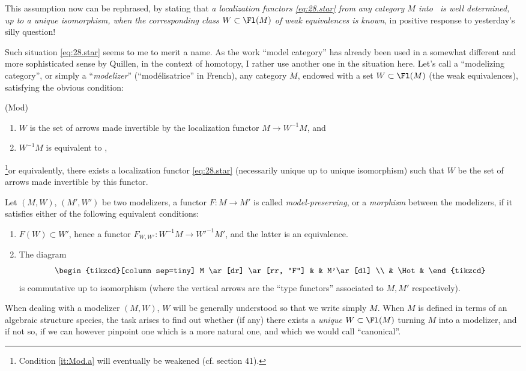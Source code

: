 This assumption now can be rephrased, by stating that \emph{a localization
functors \eqref{eq:28.star} from any category $M$ into \Hot\ is well
determined, up to a unique isomorphism, when the corresponding class
$W \subset \Fl(M)$ of weak equivalences is known}, in positive response
to yesterday's silly question!

Such situation \eqref{eq:28.star} seems to me to merit a name. As the
work ``model category'' has already been used in a somewhat different
and more sophisticated sense by Quillen, in the context of homotopy, I
rather use another one in the situation here. Let's call
a ``modelizing category'', or simply a ``\emph{modelizer}''
(``mod\'elisatrice'' in French), any category $M$, endowed with a set
$W \subset \Fl(M)$ (the weak equivalences), satisfying the obvious
condition:

\noindent\parbox[t]{0.1\textwidth}{(Mod)\par}
\parbox[t]{0.9\textwidth}{\vspace*{-11pt}%
  \begin{enumerate}[,label=\alph*)]
  \item\label{it:Mod.a}
    $W$ is the set of arrows made invertible by the localization
    functor $M \to W^{-1}M$, and
  \item\label{it:Mod.b}
    $W^{-1}M$ is equivalent to \Hot,
  \end{enumerate}}
\footnote{Condition \ref{it:Mod.a} will eventually be weakened (cf. section 41).}or equivalently, there exists a localization functor
\eqref{eq:28.star} (necessarily unique up to unique isomorphism) such
that $W$ be the set of arrows made invertible by this functor.

Let $(M,W)$, $(M',W')$ be two modelizers, a functor $F: M\to M'$ is
called \emph{model-preserving}, or a \emph{morphism} between the
modelizers, if it satisfies either of the following equivalent
conditions:
\begin{enumerate}[label=(\roman*)]
\item $F(W) \subset W'$, hence a functor $F_{W,W'}: W^{-1}M \to
  W'^{-1}M'$, and the latter is an equivalence.
\item The diagram
\[  \begin{tikzcd}[column sep=tiny]
    M \ar[dr] \ar[rr, "F"] & & M'\ar[dl] \\ & \Hot &
  \end{tikzcd}\]
  is commutative up to isomorphism (where the vertical arrows are the
  ``type functors'' associated to $M,M'$ respectively).
\end{enumerate}
When dealing with a modelizer $(M,W)$, $W$ will be generally
understood so that we write simply $M$. When $M$ is defined in terms
of an algebraic structure species, the task arises to find out whether
(if any) there exists a \emph{unique} $W \subset \Fl(M)$ turning $M$
into a modelizer, and if not so, if we can however pinpoint one which
is a more natural one, and which we would call ``canonical''.

